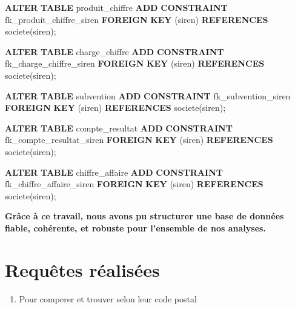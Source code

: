 \documentclass[mstat,12pt]{unswthesis}
\newenvironment{Shaded}{\begin{snugshade}}{\end{snugshade}}
\newcommand{\KeywordTok}[1]{\textcolor[rgb]{0.13,0.29,0.53}{\textbf{#1}}}
\newcommand{\NormalTok}[1]{#1}
\begin{document}
\newpage

\begin{Shaded}
\begin{Highlighting}[]
\KeywordTok{ALTER} \KeywordTok{TABLE}\NormalTok{ produit\_chiffre}
\KeywordTok{ADD} \KeywordTok{CONSTRAINT}\NormalTok{ fk\_produit\_chiffre\_siren }
\KeywordTok{FOREIGN} \KeywordTok{KEY}\NormalTok{ (siren) }\KeywordTok{REFERENCES}\NormalTok{ societe(siren);}

\KeywordTok{ALTER} \KeywordTok{TABLE}\NormalTok{ charge\_chiffre}
\KeywordTok{ADD} \KeywordTok{CONSTRAINT}\NormalTok{ fk\_charge\_chiffre\_siren }
\KeywordTok{FOREIGN} \KeywordTok{KEY}\NormalTok{ (siren) }\KeywordTok{REFERENCES}\NormalTok{ societe(siren);}

\KeywordTok{ALTER} \KeywordTok{TABLE}\NormalTok{ subvention}
\KeywordTok{ADD} \KeywordTok{CONSTRAINT}\NormalTok{ fk\_subvention\_siren }
\KeywordTok{FOREIGN} \KeywordTok{KEY}\NormalTok{ (siren) }\KeywordTok{REFERENCES}\NormalTok{ societe(siren);}

\KeywordTok{ALTER} \KeywordTok{TABLE}\NormalTok{ compte\_resultat}
\KeywordTok{ADD} \KeywordTok{CONSTRAINT}\NormalTok{ fk\_compte\_resultat\_siren }
\KeywordTok{FOREIGN} \KeywordTok{KEY}\NormalTok{ (siren) }\KeywordTok{REFERENCES}\NormalTok{ societe(siren);}

\KeywordTok{ALTER} \KeywordTok{TABLE}\NormalTok{ chiffre\_affaire}
\KeywordTok{ADD} \KeywordTok{CONSTRAINT}\NormalTok{ fk\_chiffre\_affaire\_siren }
\KeywordTok{FOREIGN} \KeywordTok{KEY}\NormalTok{ (siren) }\KeywordTok{REFERENCES}\NormalTok{ societe(siren);}
\end{Highlighting}
\end{Shaded}

\medskip

\textbf{Grâce à ce travail, nous avons pu structurer une base de données
fiable, cohérente, et robuste pour l'ensemble de nos analyses.}

\newpage

\newpage

\newpage

\section{Requêtes réalisées}\label{requuxeates-ruxe9alisuxe9es}

\begin{enumerate}
\def\labelenumi{\arabic{enumi})}
\tightlist
\item
  Pour comperer et trouver selon leur code postal
\end{enumerate}
\end{document}
